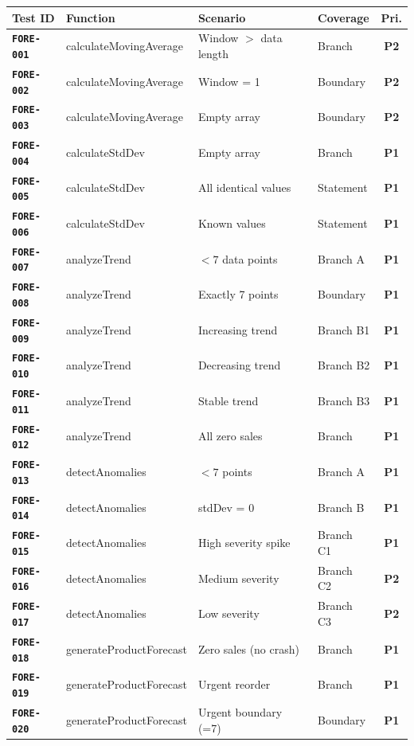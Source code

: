 \documentclass[12pt,a4paper]{report}
\newcommand{\testid}[1]{\texttt{\textbf{\color{secondary}#1}}}
\newcommand{\pone}{\textbf{\color{p1red}P1}}
\newcommand{\ptwo}{\textbf{\color{p2orange}P2}}
\begin{document}
\begin{longtable}{p{2cm}p{3.5cm}p{5cm}p{1.5cm}c}
  \toprule
  \textbf{Test ID} & \textbf{Function} & \textbf{Scenario} & \textbf{Coverage} & \textbf{Pri.} \\
  \midrule
  \endhead
  \testid{FORE-001} & calculateMovingAverage & Window $>$ data length & Branch & \ptwo \\
  \testid{FORE-002} & calculateMovingAverage & Window = 1 & Boundary & \ptwo \\
  \testid{FORE-003} & calculateMovingAverage & Empty array & Boundary & \ptwo \\
  \testid{FORE-004} & calculateStdDev & Empty array & Branch & \pone \\
  \testid{FORE-005} & calculateStdDev & All identical values & Statement & \pone \\
  \testid{FORE-006} & calculateStdDev & Known values & Statement & \pone \\
  \testid{FORE-007} & analyzeTrend & $< 7$ data points & Branch A & \pone \\
  \testid{FORE-008} & analyzeTrend & Exactly 7 points & Boundary & \pone \\
  \testid{FORE-009} & analyzeTrend & Increasing trend & Branch B1 & \pone \\
  \testid{FORE-010} & analyzeTrend & Decreasing trend & Branch B2 & \pone \\
  \testid{FORE-011} & analyzeTrend & Stable trend & Branch B3 & \pone \\
  \testid{FORE-012} & analyzeTrend & All zero sales & Branch & \pone \\
  \testid{FORE-013} & detectAnomalies & $< 7$ points & Branch A & \pone \\
  \testid{FORE-014} & detectAnomalies & stdDev = 0 & Branch B & \pone \\
  \testid{FORE-015} & detectAnomalies & High severity spike & Branch C1 & \pone \\
  \testid{FORE-016} & detectAnomalies & Medium severity & Branch C2 & \ptwo \\
  \testid{FORE-017} & detectAnomalies & Low severity & Branch C3 & \ptwo \\
  \testid{FORE-018} & generateProductForecast & Zero sales (no crash) & Branch & \pone \\
  \testid{FORE-019} & generateProductForecast & Urgent reorder & Branch & \pone \\
  \testid{FORE-020} & generateProductForecast & Urgent boundary (=7) & Boundary & \pone \\

\end{longtable}
\end{document}
